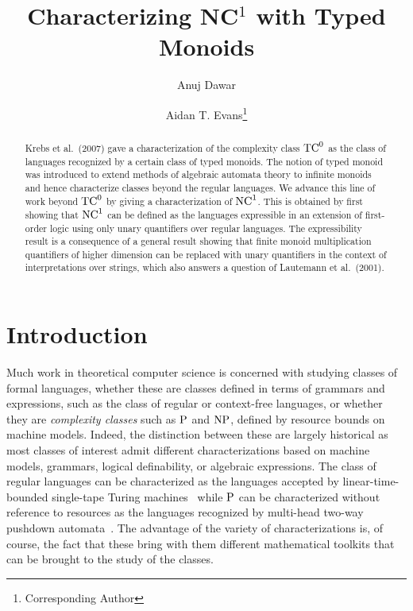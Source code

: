\documentclass[a4paper,UKenglish,cleveref, autoref, thm-restate, anonymous]{lipics-v2021}
\title{Characterizing NC${}^1$ with Typed Monoids} %
\author{Anuj Dawar}{Department of Computer Science and Technology, University of Cambridge, United Kingdom \and \url{https://www.cl.cam.ac.uk/~ad260/} }{anuj.dawar@cl.cam.ac.uk}{https://orcid.org/0000-0003-4014-8248}{(Optional) author-specific funding acknowledgements}%
\author{Aidan T. Evans\footnote{Corresponding Author}}{Department of Computer Science and Technology, University of Cambridge, United Kingdom \and \url{https://www.aidantevans.com/} }{ate26@cam.ac.uk}{https://orcid.org/0009-0007-9084-3608}{[funding]}
\begin{document}


\maketitle

\begin{abstract}
Krebs et al.~(2007) gave a characterization of the complexity class $\mathrm{TC}^0$ as the class of languages recognized by a certain class of typed monoids.  The notion of typed monoid was introduced to extend methods of algebraic automata theory to infinite monoids and hence characterize classes beyond the regular languages.  We advance this line of work beyond $\mathrm{TC}^0$ by giving a characterization of $\mathrm{NC}^1$.  This is obtained by first showing that $\mathrm{NC}^1$ can be defined as the languages expressible in an extension of first-order logic using only unary quantifiers over regular languages.  The expressibility result is a consequence of a general result showing that finite monoid multiplication quantifiers of higher dimension can be replaced with unary quantifiers in the context of interpretations over strings, which also answers a question of Lautemann et al.~(2001).
\end{abstract}

\newpage

\section{Introduction}


Much work in theoretical computer science is concerned with studying classes of formal languages, whether these are classes defined in terms of grammars and expressions, such as the class of regular or context-free languages, or whether they are \emph{complexity classes} such as $\mathrm{P}$ and $\mathrm{NP}$, defined by resource bounds on machine models.  Indeed, the distinction between these are largely historical as most classes of interest admit different characterizations based on machine models, grammars, logical definability, or algebraic expressions. The class of regular languages can be characterized as the languages accepted by linear-time-bounded single-tape Turing machines~\cite{hennie1965one} while $\mathrm{P}$ can be characterized without reference to resources as the languages recognized by multi-head two-way pushdown automata~\cite{cook1971characterizations}.  The advantage of the variety of characterizations is, of course, the fact that these bring with them different mathematical toolkits that can be brought to the study of the classes.
\end{document}
